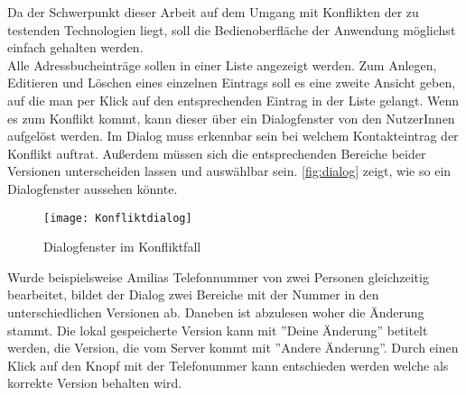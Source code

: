 Da der Schwerpunkt dieser Arbeit auf dem Umgang mit Konflikten der zu testenden Technologien liegt, soll die Bedienoberfläche der Anwendung möglichst einfach gehalten werden.\\
Alle Adressbucheinträge sollen in einer Liste angezeigt werden. Zum Anlegen, Editieren und Löschen eines einzelnen Eintrags soll es eine zweite Ansicht geben, auf die man per Klick auf den entsprechenden Eintrag in der Liste gelangt.
Wenn es zum Konflikt kommt, kann dieser über ein Dialogfenster von den NutzerInnen aufgelöst werden.
Im Dialog muss erkennbar sein bei welchem Kontakteintrag der Konflikt auftrat.
Außerdem müssen sich die entsprechenden Bereiche beider Versionen unterscheiden lassen und auswählbar sein. \autoref{fig:dialog} zeigt, wie so ein Dialogfenster aussehen könnte.
%
\begin{figure}[H]
	\centering
	\texttt{[image: Konfliktdialog]}
	\grayRule
	\caption{Dialogfenster im Konfliktfall}
	\label{fig:dialog}
\end{figure}
%
Wurde beispielsweise Amilias Telefonnummer von zwei Personen gleichzeitig bearbeitet, bildet der Dialog zwei Bereiche mit der Nummer in den unterschiedlichen Versionen ab.
Daneben ist abzulesen woher die Änderung stammt.
Die lokal gespeicherte Version kann mit ''Deine Änderung'' betitelt werden, die Version, die vom Server kommt mit ''Andere Änderung''.
Durch einen Klick auf den Knopf mit der Telefonummer kann entschieden werden welche als korrekte Version behalten wird.